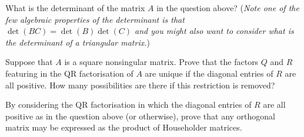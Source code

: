 \documentclass[answers]{exam}
\begin{document}
\begin{questions}



\question%
What is the determinant of the matrix $A$ in the question above? (\emph{Note one of the few algebraic properties of the determinant is that $\det(B C)=\det(B) \det(C)$ and you might also want to consider what is the determinant of a triangular matrix.})



\question%



\question%
Suppose that $A$ is a square nonsingular matrix. Prove that the factors $Q$ and $R$ featuring in the QR factorisation of $A$ are unique if the diagonal entries of $R$ are all positive. How many possibilities are there if this restriction is removed?



\question%
By considering the QR factorisation in which the diagonal entries of $R$ are all positive as in the question above (or otherwise), prove that any orthogonal matrix may be expressed as the product of Householder matrices.




\end{questions}
\end{document}
